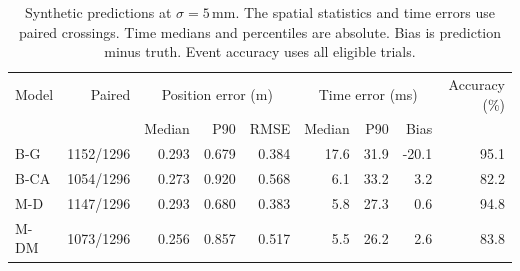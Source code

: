 \begin{table}[!htbp]
\centering
\caption{Synthetic predictions at \(\sigma=5\,\mathrm{mm}\). The spatial statistics and time errors use paired crossings. Time medians and percentiles are absolute. Bias is prediction minus truth. Event accuracy uses all eligible trials.}
\label{tab:part6-v2}
\small
\setlength{\tabcolsep}{3pt}
\begin{tabular}{@{}lrrrrrrrr@{}}
\toprule
Model & Paired & \multicolumn{3}{c}{Position error (m)} & \multicolumn{3}{c}{Time error (ms)} & Accuracy (\%) \\
\cmidrule(lr){3-5}\cmidrule(lr){6-8}
 & & Median & P90 & RMSE & Median & P90 & Bias & \\
\midrule
B-G & 1152/1296 & 0.293 & 0.679 & 0.384 & 17.6 & 31.9 & -20.1 & 95.1 \\
B-CA & 1054/1296 & 0.273 & 0.920 & 0.568 & 6.1 & 33.2 & 3.2 & 82.2 \\
M-D & 1147/1296 & 0.293 & 0.680 & 0.383 & 5.8 & 27.3 & 0.6 & 94.8 \\
M-DM & 1073/1296 & 0.256 & 0.857 & 0.517 & 5.5 & 26.2 & 2.6 & 83.8 \\
\bottomrule
\end{tabular}
\end{table}
